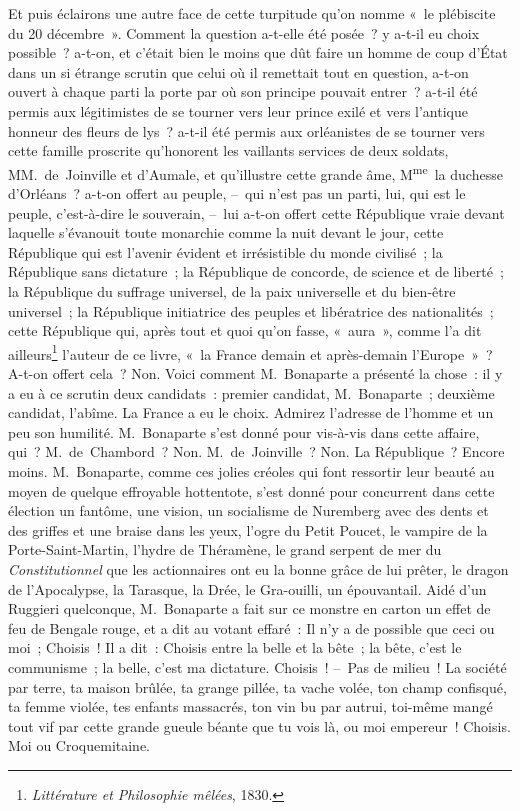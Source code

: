 \documentclass[french,twoside]{book} %
\begin{document}
Et puis éclairons une autre face de cette turpitude qu’on nomme « le plébiscite du 20 décembre ». Comment la question a-t-elle été posée ? y a-t-il eu choix possible ? a-t-on, et c’était bien le moins que dût faire un homme de coup d’État dans un si étrange scrutin que celui où il remettait tout en question, a-t-on ouvert à chaque parti la porte par où son principe pouvait entrer ? a-t-il été permis aux légitimistes de se tourner vers leur prince exilé et vers l’antique honneur des fleurs de lys ? a-t-il été permis aux orléanistes de se tourner vers cette famille proscrite qu’honorent les vaillants services de deux soldats, MM. de Joinville et d’Aumale, et qu’illustre cette grande âme, M\textsuperscript{me} la duchesse d’Orléans ? a-t-on offert au peuple, – qui n’est pas un parti, lui, qui est le peuple, c’est-à-dire le souverain, – lui a-t-on offert cette République vraie devant laquelle s’évanouit toute monarchie comme la nuit devant le jour, cette République qui est l’avenir évident et irrésistible du monde civilisé ; la République sans dictature ; la République de concorde, de science et de liberté ; la République du suffrage universel, de la paix universelle et du bien-être universel ; la République initiatrice des peuples et libératrice des nationalités ; cette République qui, après tout et quoi qu’on fasse, « aura », comme l’a dit ailleurs\footnote{\emph{Littérature et Philosophie mêlées}, 1830.} l’auteur de ce livre, « la France demain et après-demain l’Europe » ? A-t-on offert cela ? Non. Voici comment M. Bonaparte a présenté la chose : il y a eu à ce scrutin deux candidats : premier candidat, M. Bonaparte ; deuxième candidat, l’abîme. La France a eu le choix. Admirez l’adresse de l’homme et un peu son humilité. M. Bonaparte s’est donné pour vis-à-vis dans cette affaire, qui ? M. de Chambord ? Non. M. de Joinville ? Non. La République ? Encore moins. M. Bonaparte, comme ces jolies créoles qui font ressortir leur beauté au moyen de quelque effroyable hottentote, s’est donné pour concurrent dans cette élection un fantôme, une vision, un socialisme de Nuremberg avec des dents et des griffes et une braise dans les yeux, l’ogre du Petit Poucet, le vampire de la Porte-Saint-Martin, l’hydre de Théramène, le grand serpent de mer du \emph{Constitutionnel} que les actionnaires ont eu la bonne grâce de lui prêter, le dragon de l’Apocalypse, la Tarasque, la Drée, le Gra-ouilli, un épouvantail. Aidé d’un Ruggieri quelconque, M. Bonaparte a fait sur ce monstre en carton un effet de feu de Bengale rouge, et a dit au votant effaré : Il n’y a de possible que ceci ou moi ; Choisis ! Il a dit : Choisis entre la belle et la bête ; la bête, c’est le communisme ; la belle, c’est ma dictature. Choisis ! – Pas de milieu ! La société par terre, ta maison brûlée, ta grange pillée, ta vache volée, ton champ confisqué, ta femme violée, tes enfants massacrés, ton vin bu par autrui, toi-même mangé tout vif par cette grande gueule béante que tu vois là, ou moi empereur ! Choisis. Moi ou Croquemitaine.\par
\end{document}
